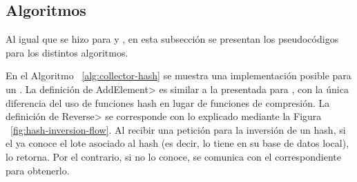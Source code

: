 
\subsection{Algoritmos}\label{subsec:hashchain-algorithms}

Al igual que se hizo para \vanilla y \compresschain, en esta subsección se presentan los pseudocódigos
para los distintos algoritmos. 


En el Algoritmo ~\ref{alg:collector-hash} se muestra una implementación posible para un
\hcollector.
%
La definición de \<AddElement> es similar a la presentada para \compresschain,
con la única diferencia del uso de funciones hash en lugar de funciones de compresión.
%
La definición de \<Reverse> se corresponde con lo explicado mediante la Figura ~\ref{fig:hash-inversion-flow}.
%
Al recibir una petición para la inversión de un hash, si el \hcollector ya conoce el lote asociado al hash
(es decir, lo tiene en su base de datos local), lo retorna.
%
Por el contrario, si no lo conoce, se comunica con el \hcollector correspondiente para obtenerlo.  

